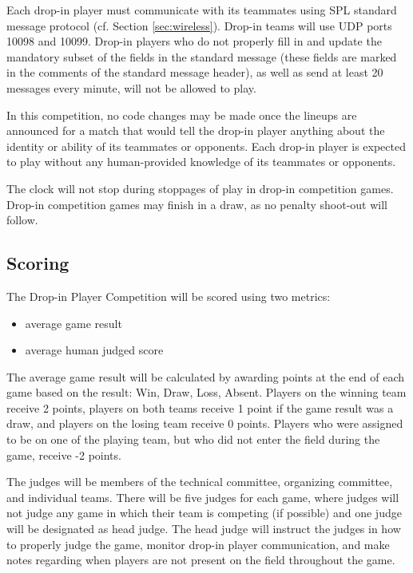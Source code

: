\documentclass[12pt]{article}
\newcommand{\cf}{\mbox{cf.}\xspace}
\begin{document}
Each drop-in player must communicate with its teammates using SPL standard message protocol (\cf Section \ref{sec:wireless}).  Drop-in teams will use UDP ports 10098 and 10099.  Drop-in players who do not properly fill in and update the mandatory subset of the fields in the standard message (these fields are marked in the comments of the standard message header), as well as send at least 20 messages every minute, will not be allowed to play. 

In this competition, no code changes may be made once the lineups are announced for a match that would tell the drop-in player anything about the identity or ability of its teammates or opponents.  Each drop-in player is expected to play without any human-provided knowledge of its teammates or opponents. 

The clock will not stop during stoppages of play in drop-in competition games.  Drop-in competition games may finish in a draw, as no penalty shoot-out will follow.

\subsection{Scoring}
\label{sec:drop-in:scoring}
The Drop-in Player Competition will be scored using two metrics: 
\begin{itemize}
\item average game result
\item average human judged score 
\end{itemize}

The average game result will be calculated by awarding points at the end of each game based on the result: Win, Draw, Loss, Absent.  Players on the winning team receive 2 points, players on both teams receive 1 point if the game result was a draw, and players on the losing team receive 0 points.  Players who were assigned to be on one of the playing team, but who did not enter the field during the game, receive -2 points.

The judges will be members of the technical committee, organizing committee, and individual teams.  There will be five judges for each game, where judges will not judge any game in which their team is competing (if possible) and one judge will be designated as head judge.  The head judge will instruct the judges in how to properly judge the game, monitor drop-in player communication, and make notes regarding when players are not present on the field throughout the game.
\end{document}

